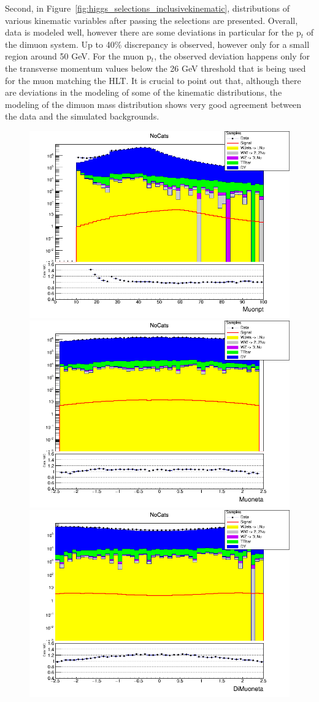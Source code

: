  Second, in Figure~\ref{fig:higgs_selections_inclusivekinematic}, distributions of various kinematic variables after passing the selections are presented. Overall, data is modeled well, however there are some deviations in particular for the p$_t$ of the dimuon system. Up to 40\% discrepancy is observed, however only for a small region around 50 GeV. For the muon p$_t$, the observed deviation happens only for the transverse momentum values below the 26 GeV threshold that is being used for the muon matching the HLT. It is crucial to point out that, although there are deviations in the modeling of some of the kinematic distributions, the modeling of the dimuon mass distribution shows very good agreement between the data and the simulated backgrounds.
  \begin{figure}[htbp]
    \centering
    \includegraphics[width=0.45\linewidth]{figures/ch_higgs/distributions/baseline_kalman/distribution__NoCats__Muonpt__logY.png}
    \includegraphics[width=0.45\linewidth]{figures/ch_higgs/distributions/baseline_kalman/distribution__NoCats__Muoneta__logY.png}\\
    \includegraphics[width=0.45\linewidth]{figures/ch_higgs/distributions/baseline_kalman/distribution__NoCats__DiMuoneta__logY.png}

\end{figure}
